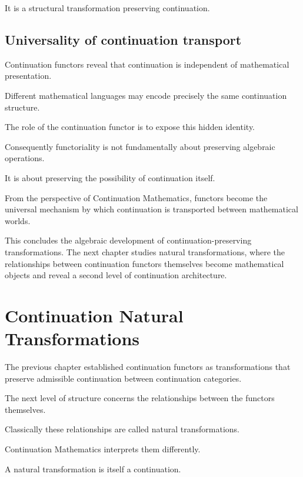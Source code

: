 \documentclass[13pt,openany]{book}
\theoremstyle{plain}
\theoremstyle{definition}
\begin{document}
It is a structural transformation preserving continuation.

\section{Universality of continuation transport}

Continuation functors reveal that continuation is independent of mathematical
presentation.

Different mathematical languages may encode precisely the same continuation
structure.

The role of the continuation functor is to expose this hidden identity.

Consequently functoriality is not fundamentally about preserving algebraic
operations.

It is about preserving the possibility of continuation itself.

From the perspective of Continuation Mathematics, functors become the universal
mechanism by which continuation is transported between mathematical worlds.

This concludes the algebraic development of continuation-preserving
transformations. The next chapter studies natural transformations, where the
relationships between continuation functors themselves become mathematical
objects and reveal a second level of continuation architecture.

\chapter{Continuation Natural Transformations}

The previous chapter established continuation functors as transformations that
preserve admissible continuation between continuation categories.

The next level of structure concerns the relationships between the functors
themselves.

Classically these relationships are called natural transformations.

Continuation Mathematics interprets them differently.

A natural transformation is itself a continuation.
\end{document}
